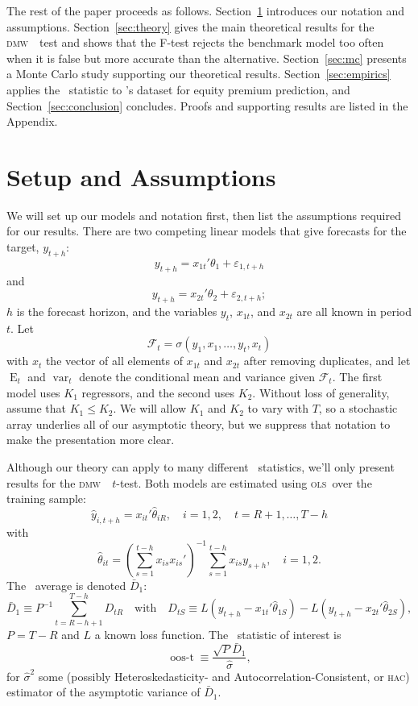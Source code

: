 \documentclass[11pt]{article}
\DeclareMathOperator{\E}{E}
\DeclareMathOperator{\var}{var}
\newcommand{\citepos}[1]{\citeauthor{#1}'s \citeyearpar{#1}}
\newcommand{\oost}{\ensuremath{\operatorname{oos-t}}}
\newcommand{\oosSum}[2]{\ensuremath{\sum_{#1=R-\h+#2}^{T-\h}}}
\newcommand{\h}{h}
\newcommand{\bh}[1]{\ensuremath{\hat\theta_{#1}}}
\newcommand{\dmw}{\textsc{dmw}}
\newcommand{\ols}{\textsc{ols}}
\newcommand{\hac}{\textsc{hac}}
\begin{document}
The rest of the paper proceeds as follows.
Section~\ref{sec:assumptions} introduces our notation and assumptions.
Section~\ref{sec:theory} gives the main theoretical results for the
\dmw\ \oos\ test and shows that the F-test rejects the benchmark model
too often when it is false but more accurate than the
alternative. Section~\ref{sec:mc} presents a Monte Carlo study
supporting our theoretical results.  Section~\ref{sec:empirics}
applies the \oos\ statistic to \citepos{GoW:08} dataset
for equity premium prediction, and Section~\ref{sec:conclusion}
concludes.  Proofs and supporting results are listed in the Appendix.

\section{Setup and Assumptions}\label{sec:assumptions}
We will set up our models and notation first, then list the assumptions
required for our results.  There are two competing linear models that
give forecasts for the target, $y_{t+\h}$:
\[
y_{t+\h} = x_{1t}'\theta_1 + \varepsilon_{1,t+h}
\]
and
\[
y_{t+\h} = x_{2t}'\theta_2 + \varepsilon_{2,t+h};
\]
$\h$ is the forecast horizon, and the variables $y_t$, $x_{1t}$, and
$x_{2t}$ are all known in period $t$.  Let
\begin{equation*}
  \mathcal{F}_t = \sigma(y_1, x_1, \dots, y_t, x_t)
\end{equation*}
with $x_t$ the vector of all elements of $x_{1t}$ and $x_{2t}$ after
removing duplicates, and let $\E_t$ and $\var_t$ denote the
conditional mean and variance given $\mathcal{F}_t$.  The first model
uses $K_1$ regressors, and the second uses $K_2$.  Without loss of
generality, assume that $K_1 \leq K_2$.  We will allow $K_1$ and $K_2$
to vary with $T$, so a stochastic array underlies all of our
asymptotic theory, but we suppress that notation to make the
presentation more clear.

Although our theory can apply to many different \oos\ statistics,
we'll only present results for the \dmw\ \oos\ $t$-test.  Both models
are estimated using \ols\ over the training sample:
\[
\hat y_{i,t+\h} = x_{it}'\bh{iR}, \quad i=1,2, \quad t = R+1,\dots,T-h
\]
with
\[
\bh{it} = (\sum_{s=1}^{t-\h} x_{is}x_{is}')^{-1} \sum_{s=1}^{t-\h} x_{is} y_{s+\h},
\quad i=1,2.
\]
The \oos\ average is denoted $\bar D_1$:
\[
\bar D_1 \equiv P^{-1} \oosSum{t}{1} D_{tR}
\quad \text{with} \quad D_{tS} \equiv L(y_{t+\h} - x_{1t}'\bh{1S}) -
L(y_{t+\h} - x_{2t}'\bh{2S}),
\]
$P = T - R$ and $L$ a known loss function.  The \oos\ statistic
of interest is 
\[
\oost \equiv \frac{\sqrt{P} \bar D_1}{\hat\sigma},
\]
for $\hat\sigma^2$ some (possibly Heteroskedasticity- and
Autocorrelation-Consistent, or \hac) estimator of the asymptotic
variance of $\bar D_1$.
\end{document}
